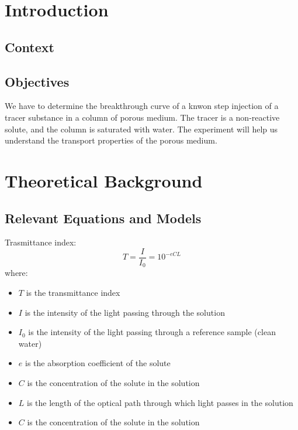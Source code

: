 \section{Introduction}

\subsection{Context}

\subsection{Objectives}
We have to determine the breakthrough curve of a knwon step injection of a tracer substance in a column of porous medium.
The tracer is a non-reactive solute, and the column is saturated with water.
The experiment will help us understand the transport properties of the porous medium.

\section{Theoretical Background}

\subsection{Relevant Equations and Models}
Trasmittance index:
\begin{equation}
    T = \frac{I}{I_0} = 10^{-e C L}
\end{equation}
where:  
\begin{itemize}
    \item $T$ is the transmittance index
    \item $I$ is the intensity of the light passing through the solution
    \item $I_0$ is the intensity of the light passing through a reference sample (clean water)
    \item $e$ is the absorption coefficient of the solute
    \item $C$ is the concentration of the solute in the solution
    \item $L$ is the length of the optical path through which light passes in the solution
    \item $C$ is the concentration of the solute in the solution
\end{itemize}

